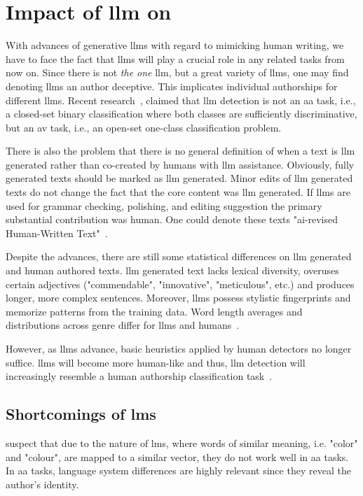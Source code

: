 \section{Impact of \acs{llm} on \ai{}}

With advances of generative \acp{llm} with regard to mimicking human writing, we have to face the fact that \acp{llm} will play a crucial role in any \ai{} related tasks from now on.
Since there is not \textit{the one} \ac{llm}, but a great variety of \acp{llm}, one may find denoting \acp{llm} an author deceptive.
This implicates individual authorships for different \acp{llm}.
Recent research~\citep{llm_detection_av_2025}, claimed that \ac{llm} detection is not an \ac{aa} task, i.e., a closed-set binary classification where both classes are sufficiently discriminative, but an \ac{av} task, i.e., an open-set one-class classification problem. 

There is also the problem that there is no general definition of when a text is \ac{llm} generated rather than co-created by humans with \ac{llm} assistance.
Obviously, fully generated texts should be marked as \ac{llm} generated.
Minor edits of \ac{llm} generated texts do not change the fact that the core content was \ac{llm} generated.
If \acp{llm} are used for grammar checking, polishing, and editing suggestion the primary substantial contribution was human.
One could denote these texts "\ac{ai}-revised Human-Written Text"~\citep{wang_stumbling_2024}.

Despite the advances, there are still some statistical differences on \ac{llm} generated and human authored texts.
\ac{llm} generated text lacks lexical diversity, overuses certain adjectives ("commendable", "innovative", "meticulous", etc.) and produces longer, more complex sentences.
Moreover, \acp{llm} possess stylistic fingerprints and memorize patterns from the training data.
Word length averages and distributions across genre differ for \acp{llm} and humans~\citep{llm_detection_av_2025}.

However, as \acp{llm} advance, basic heuristics applied by human detectors no longer suffice.
\acp{llm} will become more human-like and thus, \ac{llm} detection will increasingly resemble a human authorship classification task~\citep{llm_detection_av_2025}.


\subsection{Shortcomings of \acp{lm}}
\label{sec:topic_confusion_shortcomings_lm}
\citet{altakrori_topic_2021} suspect that due to the nature of \acp{lm}, where words of similar meaning, i.e. "color" and "colour", 
are mapped to a similar vector, they do not work well in \ac{aa} tasks.
In \ac{aa} tasks, language system differences are highly relevant since they reveal the author's identity.  